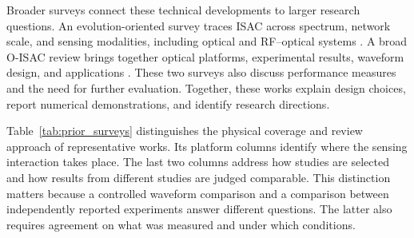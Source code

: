 Broader surveys connect these technical developments to larger research
questions. An evolution-oriented survey traces ISAC across spectrum, network
scale, and sensing modalities, including optical and RF--optical systems
\cite{Zhang2026ISACEvolution}. A broad O-ISAC review brings together optical
platforms, experimental results, waveform design, and applications
\cite{Mohsan2026OISACReview}. These two surveys also discuss performance
measures and the need for further evaluation.
Together, these works explain design choices, report numerical
demonstrations, and identify research directions.

Table~\ref{tab:prior_surveys} distinguishes the physical coverage and review
approach of representative works. Its platform columns identify where the
sensing interaction takes place. The last two columns address how studies
are selected and how results from different studies are judged comparable.
This distinction matters because a controlled waveform comparison and a
comparison between independently reported experiments answer different
questions. The latter also requires agreement on what was measured and under
which conditions.

